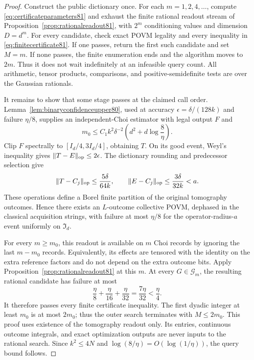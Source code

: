 \begin{proof}
Construct the public dictionary once.  For each
$m=1,2,4,\ldots$, compute \eqref{eq:certificateparameters81} and
exhaust the finite rational readout stream of
Proposition~\ref{prop:rationalreadout81}, with $2^m$ conditioning values
and dimension $D=d^m$.  For every candidate, check exact POVM
legality and every inequality in \eqref{eq:finitecertificate81}.
If one passes, return the first such candidate and set $M=m$.
If none passes, the finite enumeration ends and the algorithm moves
to $2m$.  Thus it does not wait indefinitely at an infeasible query
count.  All arithmetic, tensor products, comparisons, and
positive-semidefinite tests are over the Gaussian rationals.

It remains to show that some stage passes at the claimed call order.
Lemma~\ref{lem:binaryconfidenceupper80}, used at accuracy
$\epsilon=\delta/(128k)$ and failure $\eta/8$, supplies an
independent-Choi estimator with legal output $F$ and
\[
 m_0\le C_1 k^2\delta^{-2}
                  \left(d^2+d\log\frac8\eta\right).
\]
Clip $F$ spectrally to $[I_d/4,3I_d/4]$, obtaining $T$.
On its good event, Weyl's inequality gives
$\|T-E\|_{\rm op}\le2\epsilon$.
The dictionary rounding and predecessor selection give
\[
 \|T-C_j\|_{\rm op}\le\frac{5\delta}{64k},\qquad
 \|E-C_j\|_{\rm op}\le\frac{3\delta}{32k}<a.
\]
These operations define a Borel finite partition of the original
tomography outcomes.  Hence there exists an $L$-outcome collective
POVM, dephased in the classical acquisition strings, with failure
at most $\eta/8$ for the operator-radius-$a$ event uniformly on
$\mathfrak I_d$.

For every $m\ge m_0$, this readout is available on $m$ Choi records
by ignoring the last $m-m_0$ records.  Equivalently, its effects are
tensored with the identity on the extra reference factors and do
not depend on the extra outcome bits.  Apply
Proposition~\ref{prop:rationalreadout81} at this $m$.
At every $G\in\mathcal G_m$, the resulting rational candidate has
failure at most
\[
 \frac\eta8+\frac\eta{16}+\frac\eta{32}
   =\frac{7\eta}{32}<\frac\eta4.
\]
It therefore passes every finite certificate inequality.
The first dyadic integer at least $m_0$ is at most $2m_0$; thus the
outer search terminates with $M\le2m_0$.  This proof uses existence
of the tomography readout only.  Its entries, continuous outcome
integrals, and exact optimization outputs are never inputs to the
rational search.  Since $k^2\le4N$ and
$\log(8/\eta)=O(\log(1/\eta))$, the query bound follows.


\end{proof}
